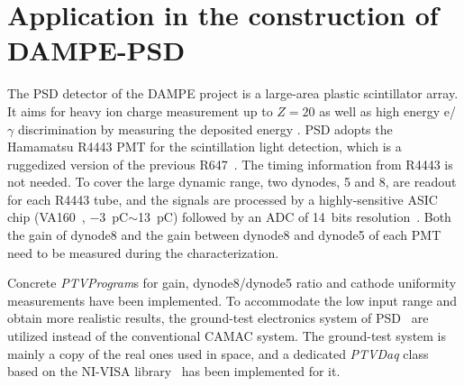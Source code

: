 \documentclass{nst}
\providecommand{\DIFadd}[1]{{\protect\color{yellow} \sf #1}} %
\providecommand{\DIFaddbegin}{} %
\providecommand{\DIFaddend}{} %
\providecommand{\DIFdelbegin}{} %
\providecommand{\DIFdelend}{} %
\begin{document}
\section{Application in the construction of DAMPE-PSD}
\label{sec:application}

The PSD detector of the DAMPE project is a large-area plastic scintillator array\DIFdelbegin \DIFdelend . It aims for \DIFaddbegin \DIFadd{heavy ion charge measurement up to $Z=20$ as well as }\DIFaddend high energy e/$\gamma$ discrimination \DIFdelbegin \DIFdelend by measuring the deposited energy\DIFdelbegin \DIFdelend \DIFaddbegin \DIFadd{. PSD adopts the Hamamatsu R4443 PMT for the scintillation light detection, which is a ruggedized version of the previous R647~\cite{r4443}. The timing information from R4443 }\DIFaddend is not needed. To cover the large dynamic range, two dynodes, 5 and 8, are readout for each R4443 tube, 
and the signals are processed by a highly-sensitive ASIC chip (VA160~\cite{va160}, \SI{-3}{\pico\coulomb}$\sim$\SI{13}{\pico\coulomb}) \DIFdelbegin \DIFdelend \DIFaddbegin \DIFadd{followed by }\DIFaddend an ADC of 14~bits resolution~\cite{yanghaibo_fee}. 
Both the gain of dynode8 and the gain between dynode8 and dynode5 of each PMT need to be  measured \DIFdelbegin \DIFdelend \DIFaddbegin \DIFadd{during the characterization}\DIFaddend .

Concrete \textit{PTVProgram}s for gain, dynode8/dynode5 ratio and cathode uniformity measurements have been implemented.
To accommodate the low input range and obtain more realistic results, the ground-test electronics system of PSD~\cite{yanghaibo_fee} are utilized instead of the conventional CAMAC system. 
The ground-test system is mainly a copy of the real ones used in space, and a dedicated \textit{PTVDaq} class based on the NI-VISA library~\cite{ni_visa} has been implemented for it.

\end{document}
